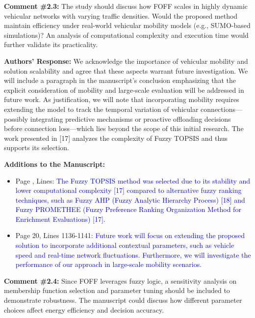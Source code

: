 \begin{mdframed}[style=review] 
\textbf{Comment \#2.3:} The study should discuss how FOFF scales in highly dynamic vehicular networks with varying traffic densities. Would the proposed method maintain efficiency under real-world vehicular mobility models (e.g., SUMO-based simulations)? An analysis of computational complexity and execution time would further validate its practicality.
\end{mdframed}

\textbf{Authors' Response:} 
We acknowledge the importance of vehicular mobility and solution scalability and agree that these aspects warrant future investigation. We will include a paragraph in the manuscript's conclusion emphasizing that the explicit consideration of mobility and large-scale evaluation will be addressed in future work. As justification, we will note that incorporating mobility requires extending the model to track the temporal variation of vehicular connections—possibly integrating predictive mechanisms or proactive offloading decisions before connection loss—which lies beyond the scope of this initial research. The work presented in [17] analyzes the complexity of Fuzzy TOPSIS and thus supports its selection.

\vspace{\baselineskip}

\textbf{Additions to the Manuscript:} 

\begin{itemize}
    \item Page , Lines: \textcolor{blue}{The Fuzzy TOPSIS method was selected due to its stability and lower computational complexity [17] compared to alternative fuzzy ranking techniques, such as Fuzzy AHP (Fuzzy Analytic Hierarchy Process) [18] and Fuzzy PROMETHEE (Fuzzy Preference Ranking Organization Method for Enrichment Evaluations) [17].}
    \item Page 20, Lines 1136-1141: \textcolor{blue}{Future work will focus on extending the proposed solution to incorporate additional contextual parameters, such as vehicle speed and real-time network fluctuations. Furthermore, we will investigate the performance of our approach in large-scale mobility scenarios.}
\end{itemize}

\begin{mdframed}[style=review] 
\textbf{Comment \#2.4:} Since FOFF leverages fuzzy logic, a sensitivity analysis on membership function selection and parameter tuning should be included to demonstrate robustness. The manuscript could discuss how different parameter choices affect energy efficiency and decision accuracy.
\end{mdframed}

